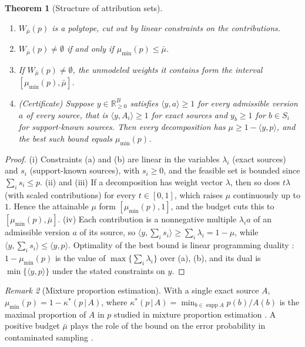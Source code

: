 \documentclass[11pt]{article}
\newtheorem{theorem}{Theorem}[section]
\theoremstyle{definition}
\theoremstyle{remark}
\newtheorem{remark}[theorem]{Remark}
\newcommand{\supp}{\operatorname{supp}}
\begin{document}
\begin{theorem}[Structure of attribution sets]\label{thm:attset}
\leavevmode
\begin{enumerate}[label=(\roman*)]
\item $W_{\bar\mu}(p)$ is a polytope, cut out by linear constraints on the contributions.
\item $W_{\bar\mu}(p)\ne\emptyset$ if and only if $\mu_{\min}(p)\le\bar\mu$.
\item If $W_{\bar\mu}(p)\ne\emptyset$, the unmodeled weights it contains form the interval
  $[\mu_{\min}(p),\bar\mu]$.
\item (Certificate) Suppose $y\in\mathbb{R}^B_{\ge0}$ satisfies $\langle y,a\rangle\ge1$ for every
  admissible version $a$ of every source, that is $\langle y,A_i\rangle\ge1$ for exact sources and
  $y_b\ge1$ for $b\in S_i$ for support-known sources. Then every decomposition has
  $\mu\ge1-\langle y,p\rangle$, and the best such bound equals $\mu_{\min}(p)$.
\end{enumerate}
\end{theorem}
\begin{proof}
(i) Constraints (a) and (b) are linear in the variables $\lambda_i$ (exact sources) and $s_i$
(support-known sources), with $s_i\ge0$, and the feasible set is bounded since $\sum_is_i\le p$.
(ii) and (iii) If a decomposition has weight vector $\lambda$, then so does $t\lambda$ (with scaled
contributions) for every $t\in[0,1]$, which raises $\mu$ continuously up to $1$. Hence the attainable
$\mu$ form $[\mu_{\min}(p),1]$, and the budget cuts this to $[\mu_{\min}(p),\bar\mu]$.
(iv) Each contribution is a nonnegative multiple $\lambda_ia$ of an admissible version $a$ of its
source, so $\langle y,\sum_is_i\rangle\ge\sum_i\lambda_i=1-\mu$, while $\langle y,\sum_is_i\rangle
\le\langle y,p\rangle$. Optimality of the best bound is linear programming duality \cite{Schrijver1986}:
$1-\mu_{\min}(p)$ is the value of $\max\{\sum_i\lambda_i\}$ over (a), (b), and its dual is
$\min\{\langle y,p\rangle\}$ under the stated constraints on $y$.
\end{proof}

\begin{remark}[Mixture proportion estimation]\label{rem:mpe}
With a single exact source $A$, $\mu_{\min}(p)=1-\kappa^*(p\,|\,A)$, where
$\kappa^*(p\,|\,A)=\min_{b\in\supp A}p(b)/A(b)$ is the maximal proportion of $A$ in $p$ studied in
mixture proportion estimation \cite{Blanchard2010,Scott2015}. A positive budget $\bar\mu$ plays the role
of the bound on the error probability in contaminated sampling \cite{HorowitzManski1995}.
\end{remark}
\end{document}

